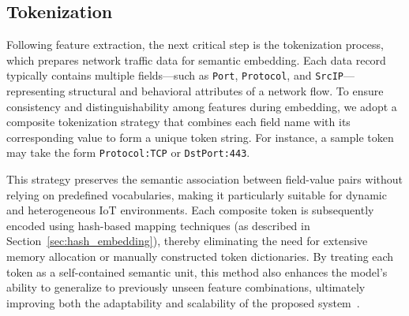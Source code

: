 \begin{ZhChapter}
        

        

    \section{Tokenization}
    Following feature extraction, the next critical step is the tokenization process, which prepares network traffic data for semantic embedding. Each data record typically contains multiple fields—such as \texttt{Port}, \texttt{Protocol}, and \texttt{SrcIP}—representing structural and behavioral attributes of a network flow. To ensure consistency and distinguishability among features during embedding, we adopt a composite tokenization strategy that combines each field name with its corresponding value to form a unique token string. For instance, a sample token may take the form \texttt{Protocol:TCP} or \texttt{DstPort:443}.
    
    This strategy preserves the semantic association between field-value pairs without relying on predefined vocabularies, making it particularly suitable for dynamic and heterogeneous IoT environments. Each composite token is subsequently encoded using hash-based mapping techniques (as described in Section~\ref{sec:hash_embedding}), thereby eliminating the need for extensive memory allocation or manually constructed token dictionaries. By treating each token as a self-contained semantic unit, this method also enhances the model’s ability to generalize to previously unseen feature combinations, ultimately improving both the adaptability and scalability of the proposed system~\cite{weinberger2009feature}.



\end{ZhChapter}
